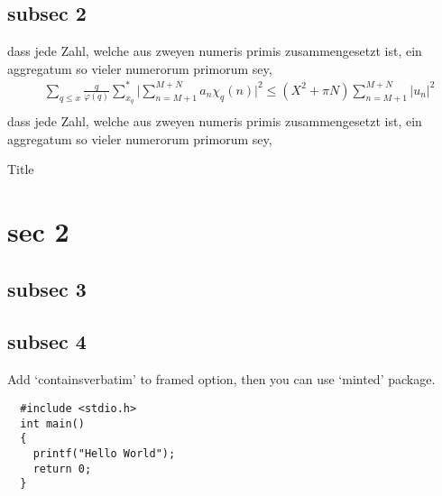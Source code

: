 \documentclass[aspectratio=169]{beamer}
\begin{document}
  \subsection{subsec 2}
  \begin{frame}
    \begin{lemma}
      dass jede Zahl, welche aus zweyen numeris primis zusammengesetzt ist, ein aggregatum so vieler 
      numerorum primorum sey, 
      \begin{align}
          & \sum_{q\leq x}\frac{q}{\varphi(q)}\sum_{x_{q}}^{*}\Big|\sum_{n=M+1}^{M+N}a_{n}\chi_{q}(n)\Big|^{2}\le (X^{2}+\pi N)\sum_{n=M+1}^{M+N}\Big|u_{n}\Big|^{2} \\
      \end{align}
      dass jede Zahl, welche aus zweyen numeris primis zusammengesetzt ist, ein aggregatum so vieler numerorum primorum sey,
    \end{lemma}
  \end{frame} 
  \begin{frame}
    \begin{block}{Title}
      \lipsum[1]
    \end{block}
  \end{frame} 

  \section{sec 2}
  \subsection{subsec 3}
  \subsection{subsec 4}

  \begin{frame}[containsverbatim]
  Add `containsverbatim' to framed option, then you can use `minted' package.
  \begin{verbatim}
  #include <stdio.h>
  int main()
  {
    printf("Hello World");
    return 0;
  }
  \end{verbatim}
  \end{frame} 
\end{document}
